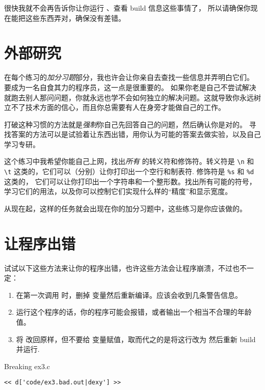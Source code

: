 很快我就不会再告诉你让你运行  、查看 build 信息这些事情了， 所以请确保你现在能把这些东西弄对，确保没有差错。

\section{外部研究}

在每个练习的\emph{加分习题}部分，我也许会让你亲自去查找一些信息并弄明白它们。 要成为一名自食其力的程序员，这一点是很重要的。 如果你老是自己不尝试解决就跑去别人那问问题，你就永远也学不会如何独立的解决问题。这就导致你永远树立不了技术方面的信心，而且你总需要有人在身旁才能做自己的工作。

打破这种习惯的方法就是\emph{强制}你自己先回答自己的问题，然后确认你是对的。 寻找答案的方法可以是试验着让东西出错，用你认为可能的答案去做实验，以及自己学习专研。

这个练习中我希望你能自己上网，找出\emph{所有}  的转义符和修饰符。转义符是
\verb|\n| 和 \verb|\t| 这类的，它们可以（分别）让你打印出一个空行和制表符. 修饰符是 \verb|%s| 和 \verb|%d| 这类的， 它们可以让你打印出一个字符串和一个整形数。找出所有可能的符号， 学习它们的用法，以及你可以控制它们实现什么样的“精度”和显示宽度。

从现在起，这样的任务就会出现在你的加分习题中，这些练习是你应该做的。

\section{让程序出错}

试试以下这些方法来让你的程序出错，也许这些方法会让程序崩溃，不过也不一定：

\begin{enumerate}
\item 在第一次调用  时，删掉  变量然后重新编译。应该会收到几条警告信息。
\item 运行这个程序的话，你的程序可能会报错，或者输出一个相当不合理的年龄值。
\item 将  改回原样，但不要给  变量赋值，取而代之的是将这行改为  然后重新 build 并运行.
\end{enumerate}


\begin{Terminal}{Breaking ex3.c}
\begin{lstlisting}
<< d['code/ex3.bad.out|dexy'] >>
\end{lstlisting}
\end{Terminal}


